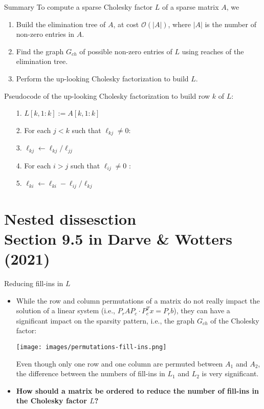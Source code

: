 \documentclass[t,usepdftitle=false]{beamer}
\begin{document}
\begin{frame}{Summary}
To compute a sparse Cholesky factor $L$ of a sparse matrix $A$, we
\begin{enumerate}
\item Build the elimination tree of $A$, at cost $\mathcal{O}(|A|)$, where $|A|$ is the number of non-zero entries in $A$.
\item Find the graph $G_{ch}$ of possible non-zero entries of $L$ using reaches of the elimination tree.
\item Perform the up-looking Cholesky factorization to build $L$.
\end{enumerate}
\vspace{.1cm}
Pseudocode of the up-looking Cholesky factorization to build row $k$ of $L$:
\begin{itemize}
\item[1.] $L[k,1:k]:=A[k,1:k]$ \vspace{.1cm}
\item[2.] For each $j<k$ such that $\ell_{kj}\neq 0$:\vspace{.1cm}
\item[3.]\hspace{.4cm}$\ell_{kj}\leftarrow\ell_{kj}/\ell_{jj}$\vspace{.1cm}
\item[4.]\hspace{.4cm}For each $i>j$ such that $\ell_{ij}\neq 0$ :\vspace{.1cm}
\item[5.]\hspace{.8cm} $\ell_{ki}\leftarrow\ell_{ki}-\ell_{ij}/\ell_{kj}$
\end{itemize}
\end{frame}


\section{Nested dissesction\\{\small Section 9.5 in Darve \& Wotters (2021)}}

\begin{frame}{Reducing fill-ins in $L$}
\begin{itemize}
\item While the row and column permutations of a matrix do not really impact the solution of a linear system (i.e., $P_rAP_c\cdot P_c^Tx=P_rb$), they can have a significant impact on the sparsity pattern, i.e., the graph $G_{ch}$ of the Cholesky factor:
\begin{center}
\vspace{-.3cm}
\texttt{[image: images/permutations-fill-ins.png]}
\end{center}
Even though only one row and one column are permuted between $A_1$ and $A_2$, the difference between the numbers of fill-ins in $L_1$ and $L_2$ is very significant.
\item \textbf{How should a matrix be ordered to reduce the number of fill-ins in the Cholesky factor $L$?}
\end{itemize}
\end{frame}
\end{document}
